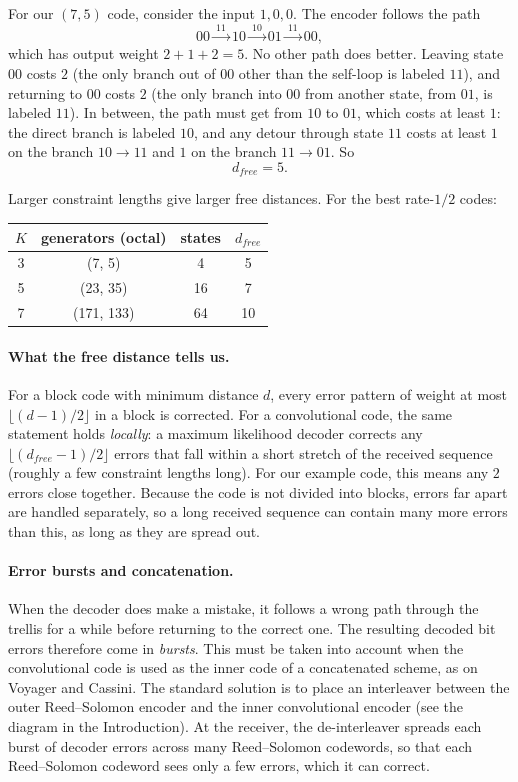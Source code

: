 \begin{example}
For our \((7,5)\) code, consider the input \(1, 0, 0\). The encoder follows the path
\[00 \xrightarrow{\ 11\ } 10 \xrightarrow{\ 10\ } 01 \xrightarrow{\ 11\ } 00,\]
which has output weight \(2 + 1 + 2 = 5\). No other path does better. Leaving state \(00\) costs \(2\) (the only branch out of \(00\) other than the self-loop is labeled \(11\)), and returning to \(00\) costs \(2\) (the only branch into \(00\) from another state, from \(01\), is labeled \(11\)). In between, the path must get from \(10\) to \(01\), which costs at least \(1\): the direct branch is labeled \(10\), and any detour through state \(11\) costs at least \(1\) on the branch \(10 \to 11\) and \(1\) on the branch \(11 \to 01\). So
\[d_{free} = 5.\]
\end{example}

Larger constraint lengths give larger free distances. For the best rate-\(1/2\) codes:
\begin{center}
\begin{tabular}{cccc}
\hline
\(K\) & generators (octal) & states & \(d_{free}\) \\
\hline
3 & (7, 5) & 4 & 5 \\
5 & (23, 35) & 16 & 7 \\
7 & (171, 133) & 64 & 10 \\
\hline
\end{tabular}
\end{center}

\paragraph{What the free distance tells us.} For a block code with minimum distance \(d\), every error pattern of weight at most \(\lfloor (d-1)/2 \rfloor\) in a block is corrected. For a convolutional code, the same statement holds \emph{locally}: a maximum likelihood decoder corrects any \(\lfloor (d_{free}-1)/2 \rfloor\) errors that fall within a short stretch of the received sequence (roughly a few constraint lengths long). For our example code, this means any \(2\) errors close together. Because the code is not divided into blocks, errors far apart are handled separately, so a long received sequence can contain many more errors than this, as long as they are spread out.

\paragraph{Error bursts and concatenation.} When the decoder does make a mistake, it follows a wrong path through the trellis for a while before returning to the correct one. The resulting decoded bit errors therefore come in \emph{bursts}. This must be taken into account when the convolutional code is used as the inner code of a concatenated scheme, as on Voyager and Cassini. The standard solution is to place an interleaver between the outer Reed--Solomon encoder and the inner convolutional encoder (see the diagram in the Introduction). At the receiver, the de-interleaver spreads each burst of decoder errors across many Reed--Solomon codewords, so that each Reed--Solomon codeword sees only a few errors, which it can correct.


